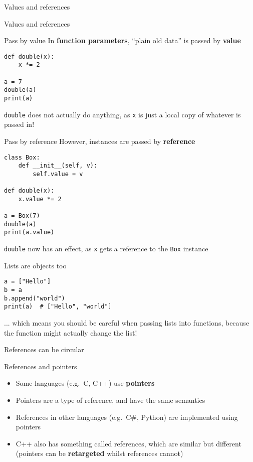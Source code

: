 \begin{frame}{Values and references}
	\socrative
	
\end{frame}

\begin{frame}{Values and references}
	\socrative
	
\end{frame}

\begin{frame}[fragile]{Pass by value}
	\pause
	In \textbf{function parameters},
	``plain old data'' is passed by \textbf{value}
	\pause
	\begin{lstlisting}
def double(x):
    x *= 2

a = 7
double(a)
print(a)
	\end{lstlisting}
	\pause
	\lstinline{double} does not actually do anything, as \lstinline{x} is just a local copy of
		whatever is passed in!
\end{frame}

\begin{frame}[fragile]{Pass by reference}
	\pause
	However, instances are passed by \textbf{reference}
	\begin{lstlisting}
class Box:
    def __init__(self, v):
        self.value = v

def double(x):
    x.value *= 2

a = Box(7)
double(a)
print(a.value)
	\end{lstlisting}
	\pause
	\lstinline{double} now has an effect, as \lstinline{x} gets a reference to the \lstinline{Box} instance
\end{frame}

\begin{frame}[fragile]{Lists are objects too}
	\pause
	\begin{lstlisting}
a = ["Hello"]
b = a
b.append("world")
print(a)  # ["Hello", "world"]
	\end{lstlisting}
	\pause
	... which means you should be careful when passing lists into functions,
	because the function might actually change the list!
\end{frame}

\begin{frame}[fragile]{References can be circular}
	
\end{frame}

\begin{frame}{References and pointers}
    \begin{itemize}
        \pause\item Some languages (e.g.\ C, C++) use \textbf{pointers}
        \pause\item Pointers are a type of reference, and have the same semantics
        \pause\item References in other languages (e.g.\ C\#, Python) are implemented using pointers
        \pause\item C++ also has something called references, which are similar but different
            (pointers can be \textbf{retargeted} whilst references cannot)
    \end{itemize}
\end{frame}


